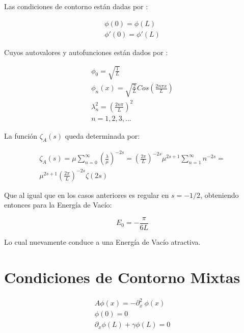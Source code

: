 Las condiciones de contorno están dadas por : 

\begin{equation}
\begin{array}{c}
    \phi (0) = \phi (L)  \\ 
    \phi ' (0) = \phi ' (L)
\end{array}
\end{equation}

Cuyos autovalores y autofunciones están dados por  : 

\begin{equation}
\begin{array}{c}
	\phi _{0} = \sqrt{\frac{1}{L}} \\ 
	\phi _{n} (x) = \sqrt{\frac{2}{L}} Cos( \frac{2 n \pi x}{L} ) \\
	\lambda _n ^2 = \left( \frac{2 n \pi }{L} \right) ^2 \\
	n = 1,2,3, ...
\end{array}
\end{equation}

La función $\zeta _A (s)$ queda determinada por:

\begin{equation}
\begin{array}{c}
\zeta _A (s) = 
\mu \sum _{n=0} ^{\infty} \left( \frac{\lambda}{\mu} \right)^{-2s} =  
\left( \frac{2 \pi}{L} \right) ^{-2s} \mu ^{2s+1} \sum _{n=1} ^{\infty} n ^{-2s} =  \\
\mu ^{2s+1} \left( \frac{2 \pi}{L} \right) ^{-2s} \zeta (2s)
\end{array}
\end{equation}

Que al igual que en los casos anteriores es regular en $s=-1/2$, obteniendo entonces para la Energía de Vacío:

\begin{equation}
E _0 = - \frac{\pi}{6 L}
\end{equation}

Lo cual nuevamente conduce a una Energía de Vacío atractiva.

\section{Condiciones de Contorno Mixtas}

\begin{equation}
\begin{array}{c}
    A \phi (x) = - \partial ^2 _x \ \phi (x)  \\
    \phi (0) = 0 \\ 
    \partial _x \phi (L) + \gamma \phi (L) = 0
\end{array}
\end{equation}

